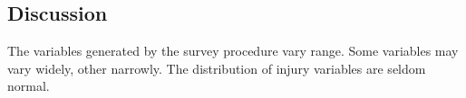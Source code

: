 \subsection{Discussion}

The variables generated by the survey procedure vary range. Some variables may vary widely, other narrowly. The distribution of injury variables are seldom normal.